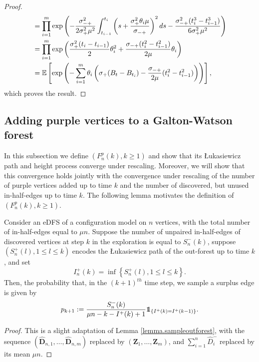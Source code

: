 \begin{proof}
\begin{align*}
     &= \prod_{i=1}^m  \exp\left( -\frac{\sigma_{-+}^2}{2\sigma_+^2 \mu^2}\int_{t_{i-1}}^{t_i}\left(s+\frac{\sigma_+^2\theta_i\mu}{\sigma_{-+}}\right)^2 ds - \frac{\sigma_{-+}^2 (t_i^3-t_{i-1}^3)}{6\sigma_+^2 \mu^2} \right)\\
     &=  \prod_{i=1}^m \exp\left(\frac{ \sigma_+^2 (t_i-t_{i-1}) }{2}\theta_i^2+\frac{\sigma_{-+} (t_i^2-t_{i-1}^2)}{2\mu}\theta_i \right)\\
     &={\mathbb E} \left[\exp\left(-\sum_{i=1}^m\theta_i\left(\sigma_+ (B_t-B_{t_i}) - \frac{\sigma_{-+}}{2\mu} (t_i^2-t_{i-1}^2)\right)\right)\right],
 \end{align*}
 which proves the result.
 \end{proof}
\subsection{Adding purple vertices to a Galton-Watson forest}\label{subsec.purpleleavesGWforest}
In this subsection we define $(F_n^p(k),k\geq 1)$  and show that its \L ukasiewicz path and height process converge under rescaling. Moreover, we will show that this convergence holds jointly with the convergence under rescaling of the number of purple vertices added up to time $k$ and the number of discovered, but unused in-half-edges up to time $k$. The following lemma motivates the definition of $(F_n^p(k),k\geq 1)$.
\begin{lemma}
Consider an eDFS of a configuration model on $n$ vertices, with the total number of in-half-edges equal to $\mu n$. Suppose the number of unpaired in-half-edges of discovered vertices at step $k$ in the exploration is equal to $S_n^{-}(k)$, suppose $(S_n^{+}(l),1\leq l\leq k)$ encodes the \L ukasiewicz path of the out-forest up to time $k$, and set $$I_n^{+}(k)=\inf\left\{S_n^{+}(l),1\leq l\leq k\right\}.$$
Then, the probability that, in the $(k+1)^{th}$ time step, we sample a surplus edge is given by
$$p_{k+1}:=\frac{S_n^{-}(k)}{\mu n - k -I^{+}(k)+1}\one_{\{I^{+}(k)=I^{+}(k-1)\}}.$$
\end{lemma}
\begin{proof}
This is a slight adaptation of Lemma \ref{lemma.sampleoutforest}, with the sequence $(\mathbf{\hat{D}}_{n,1},\dots,\mathbf{\hat{D}}_{n,m})$ replaced by $(\mathbf{Z}_1,\dots, \mathbf{Z}_m)$, and $\sum_{i=1}^n \hat{D}^-_i$ replaced by its mean $\mu n$.
\end{proof}

